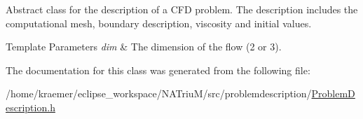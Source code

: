 \-Abstract class for the description of a \-C\-F\-D problem. \-The description includes the computational mesh, boundary description, viscosity and initial values. 


\begin{DoxyTemplParams}{\-Template Parameters}
{\em dim} & \-The dimension of the flow (2 or 3). \\
\hline
\end{DoxyTemplParams}


\-The documentation for this class was generated from the following file\-:\begin{DoxyCompactItemize}
\item 
/home/kraemer/eclipse\-\_\-workspace/\-N\-A\-Triu\-M/src/problemdescription/\hyperlink{ProblemDescription_8h}{\-Problem\-Description.\-h}\end{DoxyCompactItemize}
